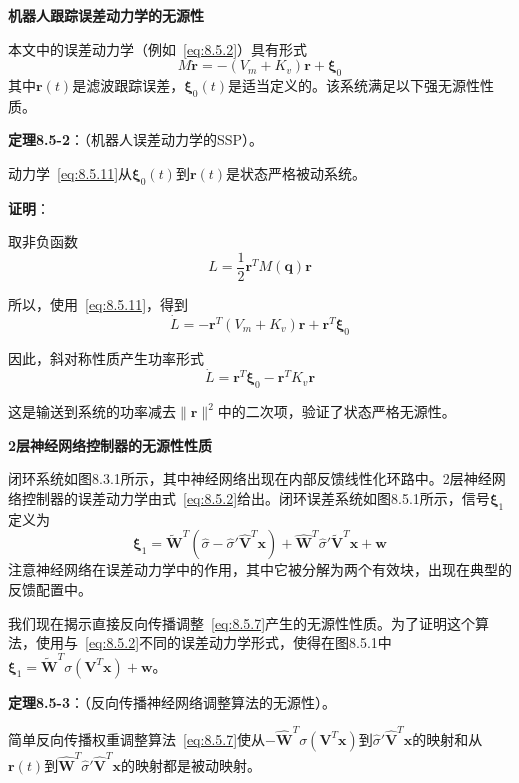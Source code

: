 \documentclass[12pt,a4paper]{ctexart}
\begin{document}
\textbf{机器人跟踪误差动力学的无源性}

本文中的误差动力学（例如~\eqref{eq:8.5.2}）具有形式
\begin{equation}\label{eq:8.5.11}
M\dot{\bm{r}} = -(V_m + K_v)\bm{r} + \bm{\xi}_0
\end{equation}
其中$\bm{r}(t)$是滤波跟踪误差，$\bm{\xi}_0(t)$是适当定义的。该系统满足以下强无源性性质。

\textbf{定理8.5-2}：（机器人误差动力学的SSP）。

动力学~\eqref{eq:8.5.11}从$\bm{\xi}_0(t)$到$\bm{r}(t)$是状态严格被动系统。

\textbf{证明}：

取非负函数
\begin{equation}
L = \frac{1}{2}\bm{r}^T M(\bm{q})\bm{r}
\end{equation}

所以，使用~\eqref{eq:8.5.11}，得到
\begin{equation}
\dot{L} = -\bm{r}^T(V_m + K_v)\bm{r} + \bm{r}^T\bm{\xi}_0
\end{equation}

因此，斜对称性质产生功率形式
\begin{equation}
\dot{L} = \bm{r}^T\bm{\xi}_0 - \bm{r}^T K_v \bm{r}
\end{equation}

这是输送到系统的功率减去$\|\bm{r}\|^2$中的二次项，验证了状态严格无源性。

\textbf{2层神经网络控制器的无源性性质}

闭环系统如图8.3.1所示，其中神经网络出现在内部反馈线性化环路中。2层神经网络控制器的误差动力学由式~\eqref{eq:8.5.2}给出。闭环误差系统如图8.5.1所示，信号$\bm{\xi}_1$定义为
\begin{equation}\label{eq:8.5.12}
\bm{\xi}_1 = \tilde{\bm{W}}^T\left(\hat{\sigma} - \hat{\sigma}'\hat{\bm{V}}^T\bm{x}\right) + \hat{\bm{W}}^T\hat{\sigma}'\tilde{\bm{V}}^T\bm{x} + \bm{w}
\end{equation}
注意神经网络在误差动力学中的作用，其中它被分解为两个有效块，出现在典型的反馈配置中。

我们现在揭示直接反向传播调整~\eqref{eq:8.5.7}产生的无源性性质。为了证明这个算法，使用与~\eqref{eq:8.5.2}不同的误差动力学形式，使得在图8.5.1中$\bm{\xi}_1 = \tilde{\bm{W}}^T\sigma(\bm{V}^T\bm{x}) + \bm{w}$。

\textbf{定理8.5-3}：（反向传播神经网络调整算法的无源性）。

简单反向传播权重调整算法~\eqref{eq:8.5.7}使从$-\hat{\bm{W}}^T\sigma(\bm{V}^T\bm{x})$到$\hat{\sigma}'\hat{\bm{V}}^T\bm{x}$的映射和从$\bm{r}(t)$到$\hat{\bm{W}}^T\hat{\sigma}'\hat{\bm{V}}^T\bm{x}$的映射都是被动映射。
\end{document}
